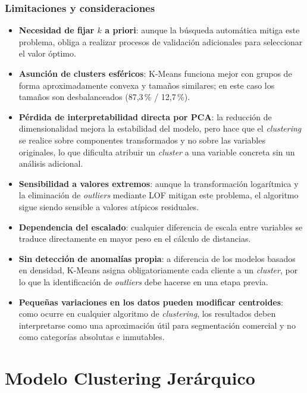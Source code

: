 \documentclass[11pt,a4paper]{article}
\begin{document}
\subsubsection{Limitaciones y consideraciones}

\begin{itemize}
    \item \textbf{Necesidad de fijar $k$ a priori}: aunque la búsqueda automática mitiga este problema, obliga a realizar procesos de validación adicionales para seleccionar el valor óptimo.
    \item \textbf{Asunción de clusters esféricos}: K-Means funciona mejor con grupos de forma aproximadamente convexa y tamaños similares; en este caso los tamaños son desbalanceados (87,3\,\% / 12,7\,\%).
    \item \textbf{Pérdida de interpretabilidad directa por PCA}: la reducción de dimensionalidad mejora la estabilidad del modelo, pero hace que el \textit{clustering} se realice sobre componentes transformados y no sobre las variables originales, lo que dificulta atribuir un \textit{cluster} a una variable concreta sin un análisis adicional.
    \item \textbf{Sensibilidad a valores extremos}: aunque la transformación logarítmica y la eliminación de \textit{outliers} mediante LOF mitigan este problema, el algoritmo sigue siendo sensible a valores atípicos residuales.
    \item \textbf{Dependencia del escalado}: cualquier diferencia de escala entre variables se traduce directamente en mayor peso en el cálculo de distancias.
    \item \textbf{Sin detección de anomalías propia}: a diferencia de los modelos basados en densidad, K-Means asigna obligatoriamente cada cliente a un \textit{cluster}, por lo que la identificación de \textit{outliers} debe hacerse en una etapa previa.
    \item \textbf{Pequeñas variaciones en los datos pueden modificar centroides}: como ocurre en cualquier algoritmo de \textit{clustering}, los resultados deben interpretarse como una aproximación útil para segmentación comercial y no como categorías absolutas e inmutables.
\end{itemize}

\section{Modelo Clustering Jerárquico}
\label{sec:jerarquico}
\end{document}

